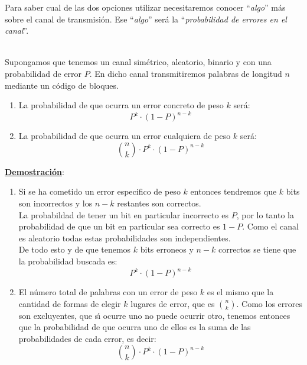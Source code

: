 Para saber cual de las dos opciones utilizar necesitaremos conocer
``\emph{algo}'' m\'as sobre el canal de transmisi\'on. Ese ``\emph{algo}''
ser\'a la ``\emph{probabilidad de errores en el canal}''.
\begin{teorema}
\ \\
Supongamos que tenemos un canal sim\'etrico, aleatorio, binario y con una
probabilidad de error $P$. En dicho canal transmitiremos palabras de longitud
$n$ mediante un c\'odigo de bloques.
\begin{enumerate}
\item La probabilidad de que ocurra un error concreto de peso $k$ ser\'a:
\begin{displaymath}
P^k\cdot (1-P)^{n-k}
\end{displaymath}
\item La probabilidad de que ocurra un error cualquiera de peso $k$ ser\'a:
\begin{displaymath}
{n \choose k}\cdot P^k\cdot (1-P)^{n-k}
\end{displaymath}
\end{enumerate}
\end{teorema}
\underline{\textbf{Demostraci\'on}}:
\begin{enumerate}
\item Si se ha cometido un error especifico de peso $k$ entonces tendremos que
$k$ bits son incorrectos y los $n-k$ restantes son correctos.\\

La probabildad de tener un bit en particular incorrecto es $P$, por lo tanto
la probabilidad de que un bit en particular sea correcto es $1-P$. Como el
canal es aleatorio todas estas probabilidades son independientes.\\

De todo esto y de que tenemos $k$ bits erroneos y $n-k$ correctos se tiene que
la probabilidad buscada es:
\begin{displaymath}
P^k\cdot (1-P)^{n-k}
\end{displaymath}
\item El n\'umero total de palabras con un error de peso $k$ es el mismo que
la cantidad de formas de elegir $k$ lugares de error, que es ${n\choose k}$. 
Como los errores son excluyentes, que s\'{\i} ocurre uno no puede
ocurrir otro, tenemos entonces que la probabilidad de que ocurra uno de ellos
es la suma de las probabilidades de cada error, es decir:
\begin{displaymath}
{n\choose k}\cdot P^k\cdot (1-P)^{n-k}
\end{displaymath}
\end{enumerate}
